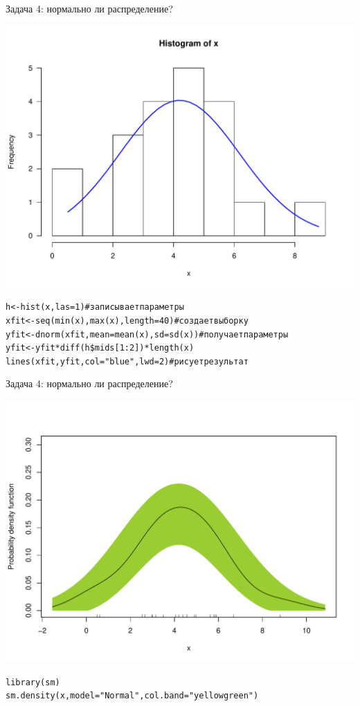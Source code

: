 \begin{frame}{Задача 4: нормально ли распределение?}
\begin{center}
\vspace{-4mm}
\includegraphics[width=0.74\linewidth]{normhist.pdf}
\end{center}
\scriptsize
\vfill
\begin{alltt}
h <- hist(x, las = 1) \hfill \# записывает параметры \\
xfit <- seq(min(x),max(x),length=40)  \hfill \# создает выборку \\
yfit <- dnorm(xfit,mean=mean(x),sd=sd(x))  \hfill \# получает  параметры \\
yfit <- yfit*diff(h\$mids[1:2])*length(x)  \\
lines(xfit, yfit, col="blue", lwd=2) \hfill \# рисует результат \\
\end{alltt}
\normalsize
\end{frame}
\begin{frame}{Задача 4: нормально ли распределение?}
\begin{center}
\vspace{-4mm}
\includegraphics[width=0.85\linewidth]{normrug.pdf}
\end{center}
\scriptsize
\vfill
\begin{alltt}
library(sm)\\
sm.density(x, model = "Normal", col.band="yellowgreen")
\end{alltt}
\normalsize
\end{frame}
